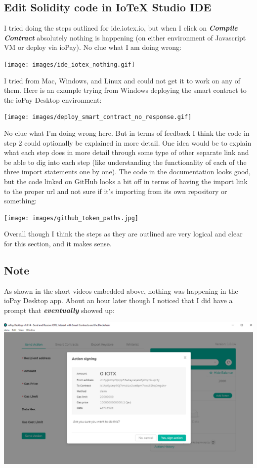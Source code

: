 \documentclass[
]{book}
\begin{document}
\hypertarget{edit-solidity-code-in-iotex-studio-ide}{%
\subsection{Edit Solidity code in IoTeX Studio
IDE}\label{edit-solidity-code-in-iotex-studio-ide}}

I tried doing the steps outlined for ide.iotex.io, but when I click on
\textbf{\emph{Compile Contract}} absolutely nothing is happening (on
either environment of Javascript VM or deploy via ioPay). No clue what I
am doing wrong:

\texttt{[image: images/ide\_iotex\_nothing.gif]}

I tried from Mac, Windows, and Linux and could not get it to work on any
of them. Here is an example trying from Windows deploying the smart
contract to the ioPay Desktop environment:

\texttt{[image: images/deploy\_smart\_contract\_no\_response.gif]}

No clue what I'm doing wrong here. But in terms of feedback I think the
code in step 2 could optionally be explained in more detail. One idea
would be to explain what each step does in more detail through some type
of other separate link and be able to dig into each step (like
understanding the functionality of each of the three import statements
one by one). The code in the documentation looks good, but the code
linked on GitHub looks a bit off in terms of having the import link to
the proper url and not sure if it's importing from its own repository or
something:

\texttt{[image: images/github\_token\_paths.jpg]}

Overall though I think the steps as they are outlined are very logical
and clear for this section, and it makes sense.

\hypertarget{note-1}{%
\subsection{Note}\label{note-1}}

As shown in the short videos embedded above, nothing was happening in
the ioPay Desktop app. About an hour later though I noticed that I did
have a prompt that \textbf{\emph{eventually}} showed up:

\includegraphics{images/desktop_prompt.PNG}
\end{document}
